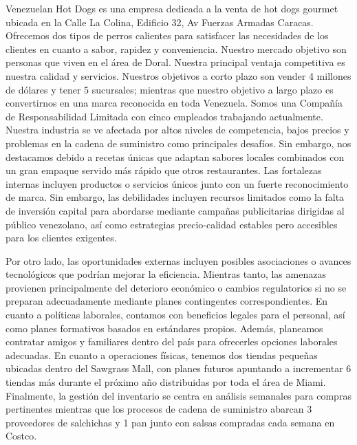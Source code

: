 Venezuelan Hot Dogs es una empresa dedicada a la venta de hot dogs gourmet ubicada en la Calle La Colina, Edificio 32, Av Fuerzas Armadas Caracas. Ofrecemos dos tipos de perros calientes para satisfacer las necesidades de los clientes en cuanto a sabor, rapidez y conveniencia. Nuestro mercado objetivo son personas que viven en el área de Doral. Nuestra principal ventaja competitiva es nuestra calidad y servicios. Nuestros objetivos a corto plazo son vender 4 millones de dólares y tener 5 sucursales; mientras que nuestro objetivo a largo plazo es convertirnos en una marca reconocida en toda Venezuela. Somos una Compañía de Responsabilidad Limitada con cinco empleados trabajando actualmente.
Nuestra industria se ve afectada por altos niveles de competencia, bajos precios y problemas en la cadena de suministro como principales desafíos. Sin embargo, nos destacamos debido a recetas únicas que adaptan sabores locales combinados con un gran empaque servido más rápido que otros restaurantes. Las fortalezas internas incluyen productos o servicios únicos junto con un fuerte reconocimiento de marca. Sin embargo, las debilidades incluyen recursos limitados como la falta de inversión capital para abordarse mediante campañas publicitarias dirigidas al público venezolano, así como estrategias precio-calidad estables pero accesibles para los clientes exigentes.

Por otro lado, las oportunidades externas incluyen posibles asociaciones o avances tecnológicos que podrían mejorar la eficiencia. Mientras tanto, las amenazas provienen principalmente del deterioro económico o cambios regulatorios si no se preparan adecuadamente mediante planes contingentes correspondientes.
En cuanto a políticas laborales, contamos con beneficios legales para el personal, así como planes formativos basados en estándares propios. Además, planeamos contratar amigos y familiares dentro del país para ofrecerles opciones laborales adecuadas. En cuanto a operaciones físicas, tenemos dos tiendas pequeñas ubicadas dentro del Sawgrass Mall, con planes futuros apuntando a incrementar 6 tiendas más durante el próximo año distribuidas por toda el área de Miami. Finalmente, la gestión del inventario se centra en análisis semanales para compras pertinentes mientras que los procesos de cadena de suministro abarcan 3 proveedores de salchichas y 1 pan junto con salsas compradas cada semana en Costco.
